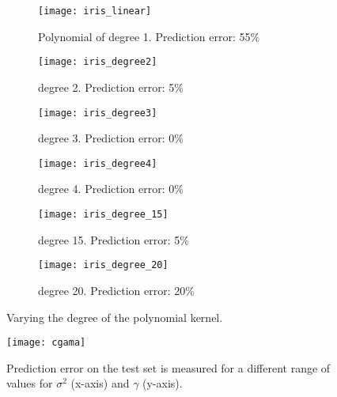 \documentclass[conference,compsoc]{IEEEtran}
\begin{document}
    \begin{figure*}[]
        \begin{subfigure}{0.33\linewidth}
            \texttt{[image: iris\_linear]}
            \caption{Polynomial of degree 1. Prediction error: 55\%}
        \end{subfigure}
        \begin{subfigure}{0.33\linewidth}
            \texttt{[image: iris\_degree2]}
            \caption{degree 2.
Prediction error: 5\%}
        \end{subfigure}
        \begin{subfigure}{0.33\linewidth}
            \texttt{[image: iris\_degree3]}
            \caption{degree 3.
Prediction error: 0\%}
        \end{subfigure}


		\begin{subfigure}{0.33\linewidth}
            \texttt{[image: iris\_degree4]}
            \caption{degree 4.
Prediction error: 0\%}
        \end{subfigure}
        \begin{subfigure}{0.33\linewidth}
            \texttt{[image: iris\_degree\_15]}
            \caption{degree 15.
Prediction error: 5\%}
        \end{subfigure}
        \begin{subfigure}{0.33\linewidth}
            \texttt{[image: iris\_degree\_20]}
            \caption{degree 20.
Prediction error: 20\%}

        \end{subfigure}
        
   
        \caption{ Varying the degree of the polynomial kernel.}        
        \label{fig:iris}
  \end{figure*}
  \begin{figure}[]
			\centering
            \texttt{[image: cgama]}
      
        \caption{ Prediction error on the test set is measured for a different range of values for $\sigma^2$ (x-axis) and $\gamma$ (y-axis).  }        
        
              
        \label{fig:cgama}
    \end{figure}
    
\end{document}
